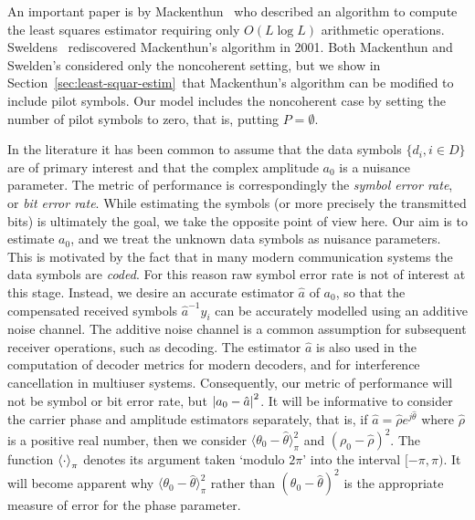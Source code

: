 \documentclass[journal]{IEEEtran}
\begin{document}
An important paper is by Mackenthun~\cite{Mackenthun1994} who described an algorithm to compute the least squares estimator requiring only $O(L \log L)$ arithmetic operations.  Sweldens~\cite{Sweldens2001} rediscovered Mackenthun's algorithm in 2001.  Both Mackenthun and Swelden's considered only the noncoherent setting, but we show in Section~\ref{sec:least-squar-estim}~that Mackenthun's algorithm can be modified to include pilot symbols. Our model includes the noncoherent case by setting the number of pilot symbols to zero, that is, putting $P = \emptyset$.  

In the literature it has been common to assume that the data symbols $\{d_i, i \in D\}$ are of primary interest and that the complex amplitude $a_0$ is a nuisance parameter.  The metric of performance is correspondingly the \emph{symbol error rate}, or \emph{bit error rate}.  While estimating the symbols (or more precisely the transmitted bits) is ultimately the goal, we take the opposite point of view here.  Our aim is to estimate $a_0$, and we treat the unknown data symbols as nuisance parameters.  This is motivated by the fact that in many modern communication systems the data symbols are \emph{coded}.  For this reason raw symbol error rate is not of interest at this stage.  Instead, we desire an accurate estimator $\hat{a}$ of $a_0$, so that the compensated received symbols $\hat{a}^{-1}y_i$ can be accurately modelled using an additive noise channel.  The additive noise channel is a common assumption for subsequent receiver operations, such as decoding.  The estimator $\hat{a}$ is also used in the computation of decoder metrics for modern decoders, and for interference cancellation in multiuser systems.  Consequently, our metric of performance will not be symbol or bit error rate, but ${\left\vert a_0 - \hat{a} \right\vert}^2$. It will be informative to consider the carrier phase and amplitude estimators separately, that is, if $\hat{a} = \hat{\rho}e^{j\hat{\theta}}$ where $\hat{\rho}$ is a positive real number, then we consider $\langle\theta_0 - \hat{\theta}\rangle_\pi^2$ and $(\rho_0 - \hat{\rho})^2$.  The function $\left\langle \cdot \right\rangle_\pi$ denotes its argument taken `modulo $2\pi$' into the interval $[-\pi, \pi)$.  It will become apparent why $\langle\theta_0 - \hat{\theta}\rangle_\pi^2$ rather than $(\theta_0 - \hat{\theta})^2$ is the appropriate measure of error for the phase parameter.
\end{document}
